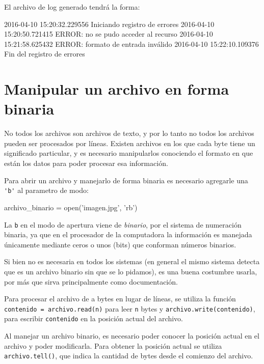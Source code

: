 El archivo de log generado tendrá la forma:

\begin{codigo-nohl-sn}
2016-04-10 15:20:32.229556 Iniciando registro de errores
2016-04-10 15:20:50.721415 ERROR: no se pudo acceder al recurso
2016-04-10 15:21:58.625432 ERROR: formato de entrada inválido
2016-04-10 15:22:10.109376 Fin del registro de errores
\end{codigo-nohl-sn}

\section{Manipular un archivo en forma binaria}

No todos los archivos son archivos de texto, y por lo tanto no todos los
archivos pueden ser procesados por líneas. Existen archivos en los que cada
byte tiene un significado particular, y es necesario manipularlos conociendo
el formato en que están los datos para poder procesar esa información.

Para abrir un archivo y manejarlo de forma binaria es necesario agregarle
una \verb!'b'! al parametro de modo:

\begin{codigo-python-sn}
archivo_binario = open('imagen.jpg', 'rb')
\end{codigo-python-sn}

\begin{sabias_que}
La \texttt{b} en el modo de apertura viene de \textit{binario}, por el
sistema de numeración binaria, ya que en el procesador de la computadora la
información es manejada únicamente mediante ceros o unos (bits) que
conforman números binarios.

Si bien no es necesaria en todos los sistemas (en general el mismo sistema
detecta que es un archivo binario sin que se lo pidamos), es una buena
costumbre usarla, por más que sirva principalmente como documentación.
\end{sabias_que}

Para procesar el archivo de a bytes en lugar de líneas, se utiliza la
función \lstinline!contenido = archivo.read(n)! para leer \lstinline!n!
bytes y \lstinline!archivo.write(contenido)!, para
escribir \lstinline!contenido! en la posición actual del archivo.

Al manejar un archivo binario, es necesario poder conocer la
posición actual en el archivo y poder modificarla. Para obtener la
posición actual se utiliza \lstinline!archivo.tell()!, que
indica la cantidad de bytes desde el comienzo del archivo.

